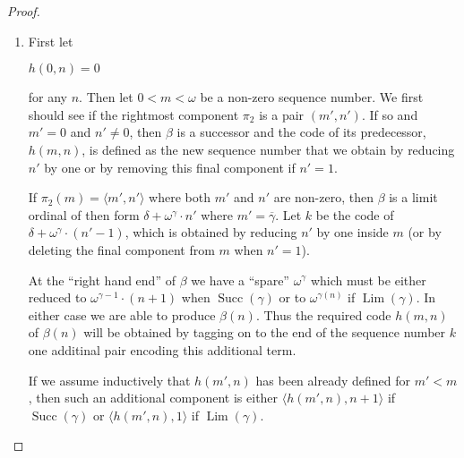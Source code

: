 \documentclass[8pt]{article}
\theoremstyle{definition}
\theoremstyle{definition}
\theoremstyle{definition}
\theoremstyle{definition}
\theoremstyle{definition}
\theoremstyle{definition}
\theoremstyle{definition}
\theoremstyle{definition}
\theoremstyle{definition}
\theoremstyle{definition}
\theoremstyle{definition}
\theoremstyle{definition}
\theoremstyle{definition}
\theoremstyle{question}
\begin{document}
\begin{proof} $ $

  \begin{enumerate}
    \item First let
    \begin{center}
      $h(0, n) = 0$
    \end{center}
    for any $n$. Then let $0 < m < \omega$ be a non-zero sequence number.
    We first should see if the rightmost component $\pi_2$ is a pair $(m', n')$. 
    If so and $m' = 0$ and $n' \neq 0$, then $\beta$ is a successor and the code of its predecessor, 
    $h(m, n)$, is defined as the new sequence number that we obtain by reducing $n'$ by one or by removing
    this final component if $n' = 1$.

    If $\pi_2(m) = \langle m', n' \rangle$ where both $m'$ and $n'$ are non-zero, then $\beta$ is a limit ordinal of then form
    $\delta + \omega^{\gamma} \cdot n'$ where $m' = \overline{\gamma}$. Let $k$ be the code of
    $\delta + \omega^{\gamma} \cdot (n' - 1)$, which is obtained by reducing $n'$ by one inside $m$ 
    (or by deleting the final component from $m$ when $n' = 1$).

    At the ``right hand end'' of $\beta$ we have a ``spare'' $\omega^{\gamma}$ which must be either reduced to
    $\omega^{\gamma - 1} \cdot (n + 1)$ when $\operatorname{Succ}(\gamma)$ or to $\omega^{\gamma(n)}$ if $\operatorname{Lim}(\gamma)$.
    In either case we are able to produce $\beta(n)$. Thus the required code $h(m, n)$ of $\beta(n)$
    will be obtained by tagging on to the end of the sequence number $k$ one additinal pair encoding this additional term.

    If we assume inductively that $h(m', n)$ has been already defined for $m' < m$, then such an additional component
    is either $\langle h(m',n), n + 1\rangle$ if $\operatorname{Succ}(\gamma)$ or $\langle h(m',n), 1\rangle$
    if $\operatorname{Lim}(\gamma)$.


\end{enumerate}
\end{proof}
\end{document}
